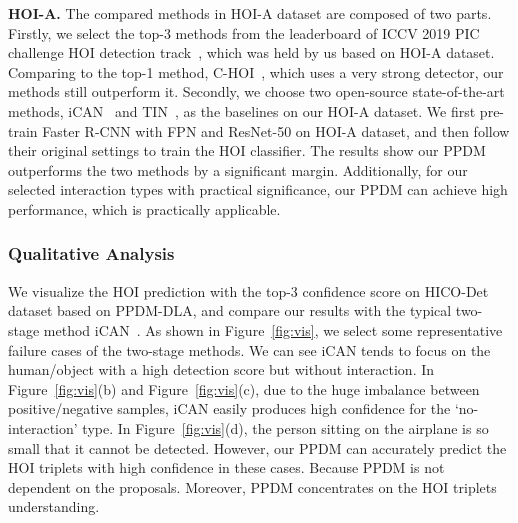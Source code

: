 \documentclass[10pt,twocolumn,letterpaper]{article}
\begin{document}
\noindent\textbf{HOI-A.}
The compared methods in HOI-A dataset are composed of two parts. Firstly, we select the top-3 methods from the leaderboard of ICCV 2019 PIC challenge HOI detection track~\cite{picleadboard}, which was held by us based on HOI-A dataset. Comparing to the top-1 method, C-HOI~\cite{Zhou_2020_CVPR}, which uses a very strong detector, our methods still outperform it.  Secondly, we choose two open-source state-of-the-art methods, iCAN~\cite{gao2018ican} and TIN~\cite{li2018transferable}, as the baselines on our HOI-A dataset. We first pre-train Faster R-CNN with FPN and ResNet-50 on HOI-A dataset, and then follow their original settings  to train the HOI classifier. The results show our PPDM outperforms the two methods by a significant margin. Additionally, for our selected interaction types with practical significance, our PPDM can achieve high performance, which is practically applicable.

\vspace{-3mm}
\subsubsection{Qualitative Analysis}
\vspace{-2mm}
We visualize the HOI prediction with the top-3 confidence score on HICO-Det dataset based on PPDM-DLA, and compare our results with the typical two-stage method iCAN~\cite{gao2018ican}. As shown in Figure~\ref{fig:vis}, we select some representative failure cases of the two-stage methods. We can see iCAN tends to focus on the human/object with a high detection score but without interaction. In Figure~\ref{fig:vis}(b) and Figure~\ref{fig:vis}(c), due to the huge imbalance between positive/negative samples,  iCAN easily produces high confidence for the `no-interaction' type. In Figure~\ref{fig:vis}(d), the person sitting on the airplane is so small that it cannot be detected. However, our PPDM can accurately predict the HOI triplets with high confidence in these cases. Because PPDM is not dependent on the proposals. Moreover, PPDM concentrates on the HOI triplets understanding.
\end{document}
